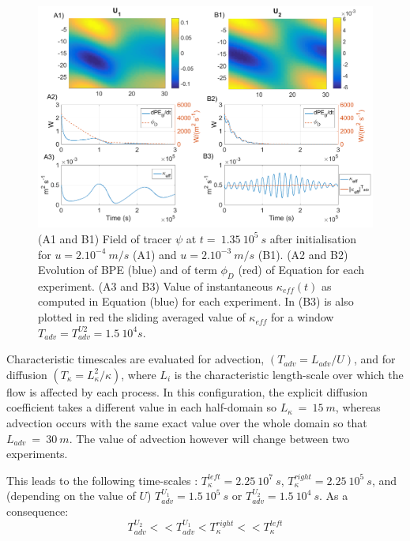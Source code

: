 \begin{figure}[h!]
\centering
\includegraphics[width=1\textwidth]{./CHAP_BPE/Fig_numlab_advdiff3.png}
\caption[Tracer field and evaluation of $\kappa_{eff}$ for configuration $BPE_{ts}$]{(A1 and B1) Field of tracer $\psi$ at $t= \ 1.35\ 10^5\ s$ after initialisation for $u=2.10^{-4} \ m/s$ (A1) and $u=2.10^{-3} \ m/s$ (B1). (A2 and B2) Evolution of BPE (blue) and of term $\phi_D$ (red) of Equation  for each experiment. (A3 and B3) Value of instantaneous $\kappa_{eff} (t)$ as computed in Equation  (blue) for each experiment. In (B3) is also plotted in red the sliding averaged value of $\kappa_{eff}$ for a window $T_{adv}=T_{adv}^{U2}=1.5\ 10^4 s$.}
\label{fig4numlab}
\end{figure}

Characteristic timescales are evaluated for advection, $(T_{adv}=L_{adv}/U)$, and for diffusion $(T_{\kappa}=L_{\kappa}^2/{\kappa})$, where $L_i$ is the characteristic length-scale over which the flow is affected by each process. In this configuration, the explicit diffusion coefficient takes a different value in each half-domain so $L_{\kappa}\ =\ 15\ m$, whereas advection occurs with the same exact value over the whole domain so that $L_{adv}\ =\ 30\ m$. The value of advection however will change between two experiments.

This leads to the following time-scales : $T_{\kappa}^{left}=2.25 \ 10^7 \ s$, $T_{\kappa}^{right}=2.25 \ 10^5 \ s$, and (depending on the value of $U$) $T_{adv}^{U_1}=1.5 \ 10^5 \ s$ or $T_{adv}^{U_2}=1.5 \ 10^4 \ s$. As a consequence:
\begin{equation}
\displaystyle
T_{adv}^{U_2}<<T_{adv}^{U_1}<T_{\kappa}^{right}<<T_{\kappa}^{left}
\end{equation}


